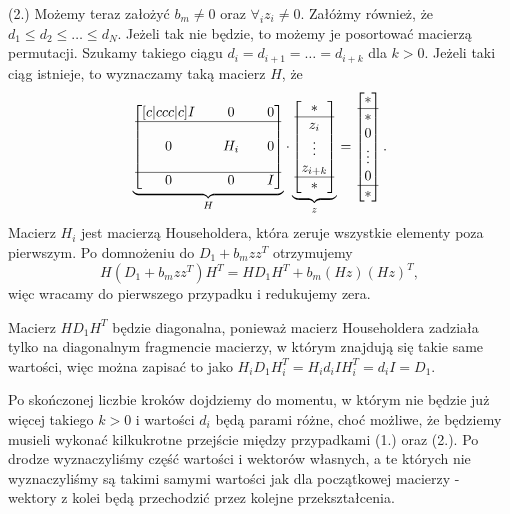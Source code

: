 \documentclass[a4paper,12pt]{article}
\begin{document}
(2.) Możemy teraz założyć $b_m \neq 0$ oraz $\forall_i z_i \neq 0$. Załóżmy również,
że $d_1 \leq d_2 \leq \dots \leq d_N$. Jeżeli tak nie będzie, to możemy je posortować
macierzą permutacji.
Szukamy takiego ciągu $d_i = d_{i+1} = \dots = d_{i+k}$ dla $k>0$. Jeżeli
taki ciąg istnieje, to wyznaczamy taką macierz $H$, że
$$
    \underbrace{
        \begin{bmatrix}[c|ccc|c]
            I &  & 0   &  & 0 \\
            \hline
              &  &     &  &   \\
            0 &  & H_i &  & 0 \\
              &  &     &  &   \\
            \hline
            0 &  & 0   &  & I
        \end{bmatrix}
    }_H
    \cdot
    \underbrace{
        \begin{bmatrix}
            *       \\
            \hline
            z_i     \\
            \vdots  \\
            z_{i+k} \\
            \hline
            *
        \end{bmatrix}
    }_{z}
    =
    \begin{bmatrix}
        *      \\
        \hline
        *      \\
        0      \\
        \vdots \\
        0      \\
        \hline
        *
    \end{bmatrix}.
$$
Macierz $H_i$ jest macierzą Householdera, która zeruje wszystkie elementy poza pierwszym.
Po domnożeniu do $D_1 + b_m zz^T$ otrzymujemy
$$
    H(D_1 + b_m zz^T)H^T = H D_1 H^T + b_m (Hz)(Hz)^T,
$$
więc wracamy do pierwszego przypadku i redukujemy zera.

Macierz $H D_1 H^T$ będzie diagonalna, ponieważ macierz Householdera zadziała
tylko na diagonalnym fragmencie macierzy, w którym znajdują się takie same wartości,
więc można zapisać to jako $H_i D_1 H_i^T = H_i d_i I H_i^T = d_i I = D_1$.

Po skończonej liczbie kroków dojdziemy do momentu, w którym nie będzie już więcej
takiego $k>0$ i wartości $d_i$ będą parami różne, choć możliwe, że będziemy musieli wykonać
kilkukrotne przejście między przypadkami (1.) oraz (2.). Po drodze wyznaczyliśmy
część wartości i wektorów własnych, a te których nie wyznaczyliśmy są takimi samymi wartości
jak dla początkowej macierzy - wektory z kolei będą przechodzić przez kolejne przekształcenia.
\end{document}
